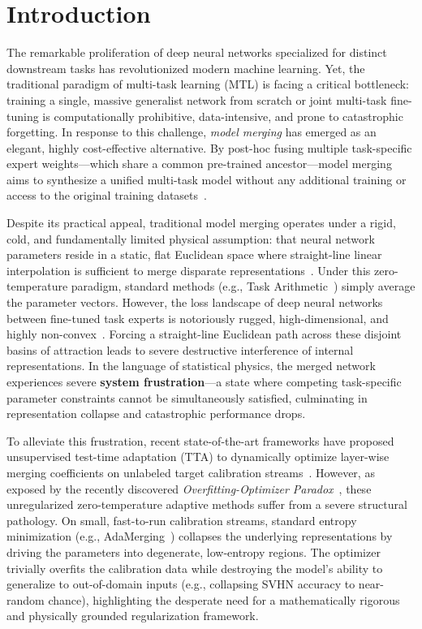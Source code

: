 \section{Introduction}
\label{sec:intro}

The remarkable proliferation of deep neural networks specialized for distinct downstream tasks has revolutionized modern machine learning. Yet, the traditional paradigm of multi-task learning (MTL) is facing a critical bottleneck: training a single, massive generalist network from scratch or joint multi-task fine-tuning is computationally prohibitive, data-intensive, and prone to catastrophic forgetting. In response to this challenge, \emph{model merging} has emerged as an elegant, highly cost-effective alternative. By post-hoc fusing multiple task-specific expert weights—which share a common pre-trained ancestor—model merging aims to synthesize a unified multi-task model without any additional training or access to the original training datasets~\cite{wortsman2022model,ilharco2022editing}.

Despite its practical appeal, traditional model merging operates under a rigid, cold, and fundamentally limited physical assumption: that neural network parameters reside in a static, flat Euclidean space where straight-line linear interpolation is sufficient to merge disparate representations~\cite{yadav2023ties,ortizjimenez2023task}. Under this zero-temperature paradigm, standard methods (e.g., Task Arithmetic~\cite{ilharco2022editing}) simply average the parameter vectors. However, the loss landscape of deep neural networks between fine-tuned task experts is notoriously rugged, high-dimensional, and highly non-convex~\cite{choromanska2015loss}. Forcing a straight-line Euclidean path across these disjoint basins of attraction leads to severe destructive interference of internal representations. In the language of statistical physics, the merged network experiences severe \textbf{system frustration}—a state where competing task-specific parameter constraints cannot be simultaneously satisfied, culminating in representation collapse and catastrophic performance drops.

To alleviate this frustration, recent state-of-the-art frameworks have proposed unsupervised test-time adaptation (TTA) to dynamically optimize layer-wise merging coefficients on unlabeled target calibration streams~\cite{yang2024adamerging,jung2025symerge}. However, as exposed by the recently discovered \emph{Overfitting-Optimizer Paradox}~\cite{overfittingoptimizerparadox}, these unregularized zero-temperature adaptive methods suffer from a severe structural pathology. On small, fast-to-run calibration streams, standard entropy minimization (e.g., AdaMerging~\cite{yang2024adamerging}) collapses the underlying representations by driving the parameters into degenerate, low-entropy regions. The optimizer trivially overfits the calibration data while destroying the model's ability to generalize to out-of-domain inputs (e.g., collapsing SVHN accuracy to near-random chance), highlighting the desperate need for a mathematically rigorous and physically grounded regularization framework.

